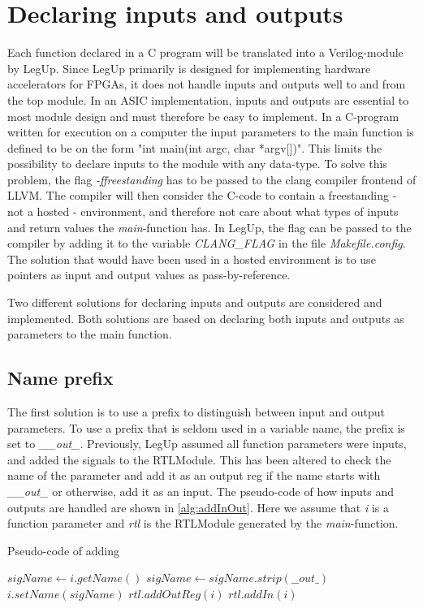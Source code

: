 \section{\label{subsec:inoutdecl}Declaring inputs and outputs}
Each function declared in a C program will be translated into a Verilog-module by LegUp. Since LegUp primarily is designed for implementing hardware accelerators for FPGAs, it does not handle inputs and outputs well to and from the top module. In an ASIC implementation, inputs and outputs are essential to most module design and must therefore be easy to implement. In a C-program written for execution on a computer the input parameters to the main function is defined to be on the form "int main(int argc, char *argv[])". This limits the possibility to declare inputs to the module with any data-type. To solve this problem, the flag \textit{-ffreestanding} has to be passed to the clang compiler frontend of LLVM. The compiler will then consider the C-code to contain a freestanding - not a hosted - environment, and therefore not care about what types of inputs and return values the \textit{main}-function has. In LegUp, the flag can be passed to the compiler by adding it to the variable \textit{CLANG\_FLAG} in the file \textit{Makefile.config}. The solution that would have been used in a hosted environment is to use pointers as input and output values as pass-by-reference.

Two different solutions for declaring inputs and outputs are considered and implemented. Both solutions are based on declaring both inputs and outputs as parameters to the main function.
\subsection{\label{subsec:inoutprefix}Name prefix}
The first solution is to use a prefix to distinguish between input and output parameters. To use a prefix that is seldom used in a variable name, the prefix is set to \textit{\_\_out\_}. Previously, LegUp assumed all function parameters were inputs, and added the signals to the RTLModule. This has been altered to check the name of the parameter and add it as an output reg if the name starts with \textit{\_\_out\_} or otherwise, add it as an input. The pseudo-code of how inputs and outputs are handled are shown in \cref{alg:addInOut}. Here we assume that \textit{i} is a function parameter and \textit{rtl} is the RTLModule generated by the \textit{main}-function.

\begin{algorithm}
  \caption{Pseudo-code of adding 
  \label{alg:addInOut}}
  \begin{algorithmic}[1]
    \Statex
    \State $sigName \gets i.getName()$
      \State $sigName \gets sigName.strip(\_\_out\_)$
      \State $i.setName(sigName)$
      \State $rtl.addOutReg(i)$
    \Else
      \State $rtl.addIn(i)$
    \EndIf
  \end{algorithmic}
\end{algorithm}

